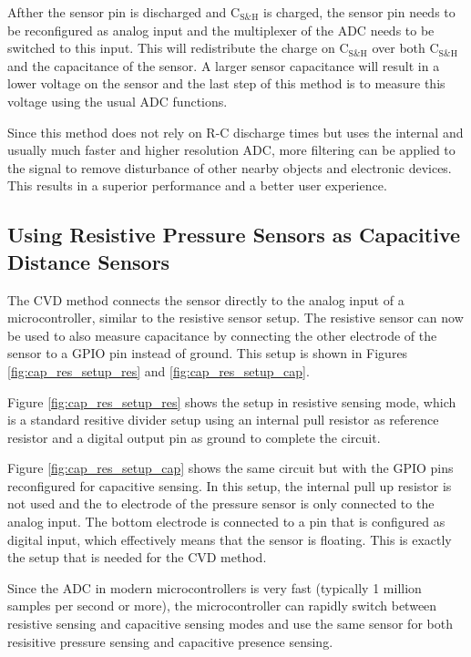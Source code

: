 \documentclass{sigchi-ext}
\begin{document}
Afther the sensor pin is discharged and $\textrm{C}_{\textrm{S\&H}}$ is
charged, the sensor pin needs to be reconfigured as analog input and the
multiplexer of the ADC needs to be switched to this input. This will
redistribute the charge on $\textrm{C}_{\textrm{S\&H}}$ over both
$\textrm{C}_{\textrm{S\&H}}$ and the capacitance of the sensor. A larger sensor
capacitance will result in a lower voltage on the sensor and the last step of
this method is to measure this voltage using the usual ADC functions.

Since this method does not rely on R-C discharge times but uses the internal and
usually much faster and higher resolution ADC, more filtering can be applied to the signal to remove
disturbance of other nearby objects and electronic devices. This results in a
superior performance and a better user experience.

\subsection{Using Resistive Pressure Sensors as Capacitive Distance Sensors}
The CVD method connects the sensor directly to the analog input of a
microcontroller, similar to the resistive sensor setup. The resistive sensor can
now be used to also measure capacitance by connecting the other electrode of the
sensor to a GPIO pin instead of ground. This setup is shown in Figures
\ref{fig:cap_res_setup_res} and \ref{fig:cap_res_setup_cap}.

Figure \ref{fig:cap_res_setup_res} shows the setup in resistive sensing mode,
which is a standard resitive divider setup using an internal pull resistor
as reference resistor and a digital output pin as ground to complete the
circuit.

Figure \ref{fig:cap_res_setup_cap} shows the same circuit but with the GPIO pins
reconfigured for capacitive sensing. In this setup, the internal pull up
resistor is not used and the to electrode of the pressure sensor is only
connected to the analog input. The bottom electrode is connected to a pin that
is configured as digital input, which effectively means that the sensor is
floating. This is exactly the setup that is needed for the CVD method.

Since the ADC in modern microcontrollers is very fast (typically 1 million
samples per second or more), the microcontroller can rapidly switch between
resistive sensing and capacitive sensing modes and use the same sensor for both
resisitive pressure sensing and capacitive presence sensing.
\end{document}

